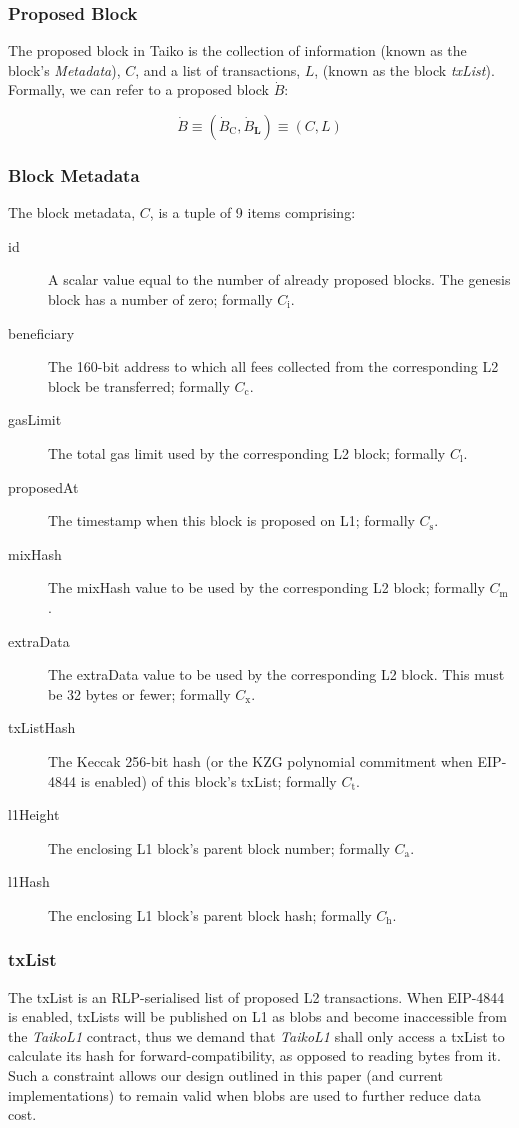 \documentclass[9pt,oneside]{amsart}
\begin{document}
\begin{multicols}{2}
\subsubsection{Proposed Block} The proposed block in Taiko is the collection of information (known as the block's \textit{Metadata}), $C$, and a list of transactions, $L$,  (known as the block \textit{txList}). Formally, we can refer to a proposed block $\dot{B}$:

\begin{equation}
\dot{B} \equiv (\dot{B}_{\mathrm{C}}, \dot{B}_{\mathbf{L}}) \equiv (C, L)
\end{equation}

\subsubsection{Block Metadata} The block metadata, $C$, is a tuple of 9 items comprising:


\begin{description}
\item[id] A scalar value equal to the number of already proposed blocks. The genesis block has a number of zero; formally $C_{\mathrm{i}}$.
\item[beneficiary] The 160-bit address to which all fees collected from the corresponding L2 block be transferred; formally $C_{\mathrm{c}}$.
\item[gasLimit] The total gas limit used by the corresponding L2 block; formally $C_{\mathrm{l}}$.
\item[proposedAt] The timestamp when this block is proposed on L1; formally $C_{\mathrm{s}}$.
\item[mixHash] The mixHash value to be used by the corresponding L2 block; formally $C_{\mathrm{m}}$.
\item[extraData] The extraData value to be used by the corresponding L2 block. This must be 32 bytes or fewer; formally $C_{\mathrm{x}}$.
\item[txListHash] The Keccak 256-bit hash (or the KZG polynomial commitment when EIP-4844 is enabled) of this block's txList; formally $C_{\mathrm{t}}$. 
\item[l1Height] The enclosing L1 block's parent block number; formally $C_{\mathrm{a}}$.
\item[l1Hash] The enclosing L1 block's parent block hash; formally $C_{\mathrm{h}}$.
\end{description}

\subsubsection{txList}\label{sec:txlist}
The txList is an RLP-serialised list of proposed L2 transactions. When EIP-4844 is enabled, txLists will be published on L1 as blobs\cite{eip4844} and become inaccessible from the \textit{TaikoL1} contract, thus we demand that \textit{TaikoL1} shall only access a txList to calculate its hash for forward-compatibility, as opposed to reading bytes from it. Such a constraint allows our design outlined in this paper (and current implementations) to remain valid when blobs are used to further reduce data cost.





\end{multicols}
\end{document}
